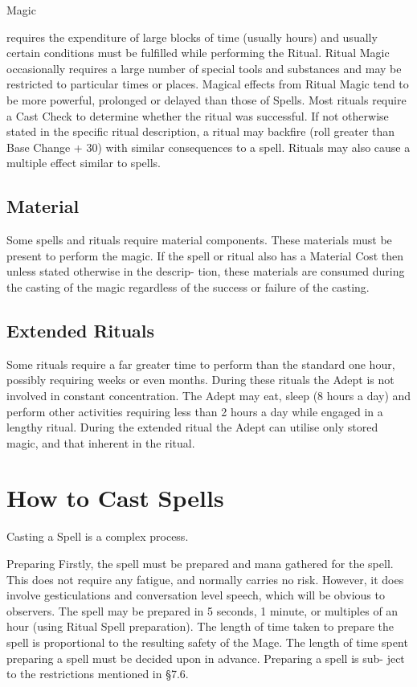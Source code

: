 \begin{Chapter}{Magic}
\begin{Description}
\item[Ritual Magic] requires the expenditure of large blocks of time
  (usually hours) and usually certain conditions must be fulfilled
  while performing the Ritual.  Ritual Magic occasionally requires a
  large number of special tools and substances and may be restricted
  to particular times or places.  Magical effects from Ritual Magic
  tend to be more powerful, prolonged or delayed than those of Spells.
  Most rituals require a Cast Check to determine whether the ritual
  was successful.  If not otherwise stated in the specific ritual
  description, a ritual may backfire (roll greater than Base Change +
  30) with similar consequences to a spell.  Rituals may also cause a
  multiple effect similar to spells.

\end{Description}

\subsection{Material}

Some spells and rituals require material components.  These materials
must be present to perform the magic.  If the spell or ritual also has
a Material Cost then unless stated otherwise in the descrip- tion,
these materials are consumed during the casting of the magic
regardless of the success or failure of the casting.


\subsection{Extended Rituals}

Some rituals require a far greater time to perform than the standard
one hour, possibly requiring weeks or even months.  During these
rituals the Adept is not involved in constant concentration.  The
Adept may eat, sleep (8 hours a day) and perform other activities
requiring less than 2 hours a day while engaged in a lengthy ritual.
During the extended ritual the Adept can utilise only stored magic,
and that inherent in the ritual.

\section{How to Cast Spells}

Casting a Spell is a complex process. 

Preparing Firstly, the spell must be prepared and mana gathered for
the spell.  This does not require any fatigue, and normally carries no
risk. However, it does involve gesticulations and conversation level
speech, which will be obvious to observers.  The spell may be prepared
in 5 seconds, 1 minute, or multiples of an hour (using Ritual Spell
preparation). The length of time taken to prepare the spell is
proportional to the resulting safety of the Mage.  The length of time
spent preparing a spell must be decided upon in advance.  Preparing a
spell is sub- ject to the restrictions mentioned in §7.6.


\end{Chapter}
